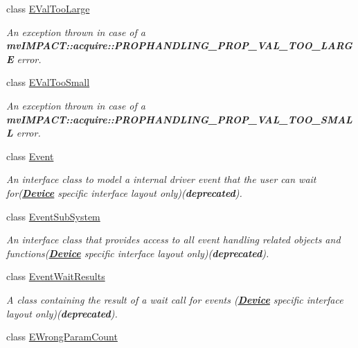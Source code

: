 \begin{DoxyCompactItemize}
class \hyperlink{classmv_i_m_p_a_c_t_1_1acquire_1_1_e_val_too_large}{E\+Val\+Too\+Large}
\begin{DoxyCompactList}\small\item\em An exception thrown in case of a {\bfseries mv\+I\+M\+P\+A\+C\+T\+::acquire\+::\+P\+R\+O\+P\+H\+A\+N\+D\+L\+I\+N\+G\+\_\+\+P\+R\+O\+P\+\_\+\+V\+A\+L\+\_\+\+T\+O\+O\+\_\+\+L\+A\+R\+G\+E} error. \end{DoxyCompactList}\item 
class \hyperlink{classmv_i_m_p_a_c_t_1_1acquire_1_1_e_val_too_small}{E\+Val\+Too\+Small}
\begin{DoxyCompactList}\small\item\em An exception thrown in case of a {\bfseries mv\+I\+M\+P\+A\+C\+T\+::acquire\+::\+P\+R\+O\+P\+H\+A\+N\+D\+L\+I\+N\+G\+\_\+\+P\+R\+O\+P\+\_\+\+V\+A\+L\+\_\+\+T\+O\+O\+\_\+\+S\+M\+A\+L\+L} error. \end{DoxyCompactList}\item 
class \hyperlink{classmv_i_m_p_a_c_t_1_1acquire_1_1_event}{Event}
\begin{DoxyCompactList}\small\item\em An interface class to model a internal driver event that the user can wait for({\bfseries \hyperlink{classmv_i_m_p_a_c_t_1_1acquire_1_1_device}{Device}} specific interface layout only)({\bfseries deprecated}). \end{DoxyCompactList}\item 
class \hyperlink{classmv_i_m_p_a_c_t_1_1acquire_1_1_event_sub_system}{Event\+Sub\+System}
\begin{DoxyCompactList}\small\item\em An interface class that provides access to all event handling related objects and functions({\bfseries \hyperlink{classmv_i_m_p_a_c_t_1_1acquire_1_1_device}{Device}} specific interface layout only)({\bfseries deprecated}). \end{DoxyCompactList}\item 
class \hyperlink{classmv_i_m_p_a_c_t_1_1acquire_1_1_event_wait_results}{Event\+Wait\+Results}
\begin{DoxyCompactList}\small\item\em A class containing the result of a wait call for events ({\bfseries \hyperlink{classmv_i_m_p_a_c_t_1_1acquire_1_1_device}{Device}} specific interface layout only)({\bfseries deprecated}). \end{DoxyCompactList}\item 
class \hyperlink{classmv_i_m_p_a_c_t_1_1acquire_1_1_e_wrong_param_count}{E\+Wrong\+Param\+Count}

\end{DoxyCompactItemize}

